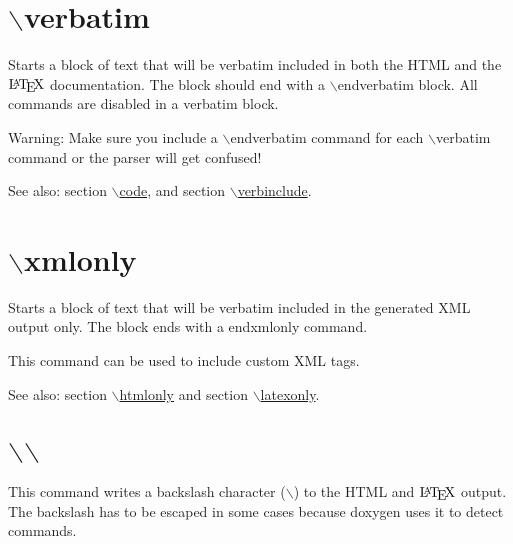  \hypertarget{commands_cmdverbatim}{}\section{$\backslash$verbatim}\label{commands_cmdverbatim}
 Starts a block of text that will be verbatim included in both the HTML and the $\mbox{\LaTeX}$ documentation. The block should end with a $\backslash$endverbatim block. All commands are disabled in a verbatim block.

\begin{Desc}
\item[Warning:]Make sure you include a $\backslash$endverbatim command for each $\backslash$verbatim command or the parser will get confused!\end{Desc}
\begin{Desc}
\item[See also:]section \hyperlink{commands_cmdcode}{$\backslash$code}, and section \hyperlink{commands_cmdverbinclude}{$\backslash$verbinclude}.\end{Desc}


 \hypertarget{commands_cmdxmlonly}{}\section{$\backslash$xmlonly}\label{commands_cmdxmlonly}
 Starts a block of text that will be verbatim included in the generated XML output only. The block ends with a endxmlonly command.

This command can be used to include custom XML tags.

\begin{Desc}
\item[See also:]section \hyperlink{commands_cmdhtmlonly}{$\backslash$htmlonly} and section \hyperlink{commands_cmdlatexonly}{$\backslash$latexonly}.\end{Desc}


 \hypertarget{commands_cmdbackslash}{}\section{$\backslash$$\backslash$}\label{commands_cmdbackslash}
\index{\\@{$\backslash$$\backslash$}} This command writes a backslash character ($\backslash$) to the HTML and $\mbox{\LaTeX}$ output. The backslash has to be escaped in some cases because doxygen uses it to detect commands.



